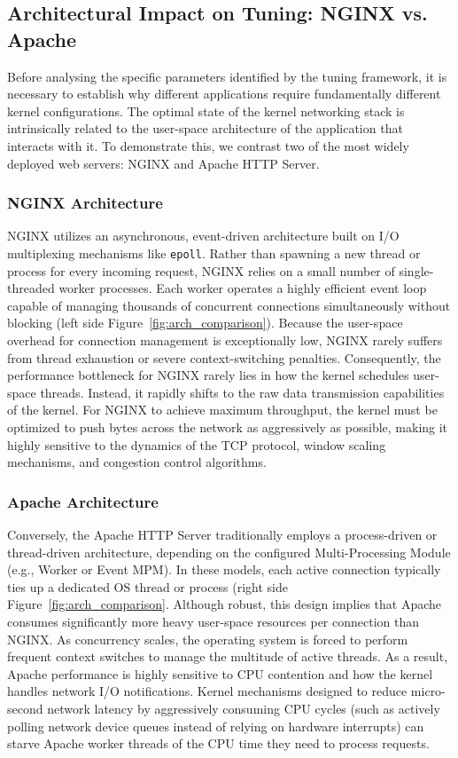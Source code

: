\subsection{Architectural Impact on Tuning: NGINX vs. Apache}

Before analysing the specific parameters identified by the tuning framework, it is necessary to establish why different applications require fundamentally different kernel configurations.
The optimal state of the kernel networking stack is intrinsically related to the user-space architecture of the application that interacts with it.
To demonstrate this, we contrast two of the most widely deployed web servers: NGINX and Apache HTTP Server.

\subsubsection{NGINX Architecture}

NGINX utilizes an asynchronous, event-driven architecture built  on I/O multiplexing mechanisms like \texttt{epoll}.
Rather than spawning a new thread or process for every incoming request, NGINX relies on a small number of single-threaded worker processes.
Each worker operates a highly efficient event loop capable of managing thousands of concurrent connections simultaneously without blocking (left side Figure~\ref{fig:arch_comparison}).
Because the user-space overhead for connection management is exceptionally low, NGINX rarely suffers from thread exhaustion or severe context-switching penalties.
Consequently, the performance bottleneck for NGINX rarely lies in how the kernel schedules user-space threads.
Instead, it rapidly shifts to the raw data transmission capabilities of the kernel.
For NGINX to achieve maximum throughput, the kernel must be optimized to push bytes across the network as aggressively as possible, making it highly sensitive to the dynamics of the TCP protocol, window scaling mechanisms, and congestion control algorithms.

\subsubsection{Apache Architecture}

Conversely, the Apache HTTP Server traditionally employs a process-driven or thread-driven architecture, depending on the configured Multi-Processing Module (e.g., Worker or Event MPM).
In these models, each active connection typically ties up a dedicated OS thread or process (right side Figure~\ref{fig:arch_comparison}.
Although robust, this design implies that Apache consumes significantly more heavy user-space resources per connection than NGINX.
As concurrency scales, the operating system is forced to perform frequent context switches to manage the multitude of active threads.
As a result, Apache performance is highly sensitive to CPU contention and how the kernel handles network I/O notifications.
Kernel mechanisms designed to reduce micro-second network latency by aggressively consuming CPU cycles (such as actively polling network device queues instead of relying on hardware interrupts) can starve Apache worker threads of the CPU time they need to process requests.

